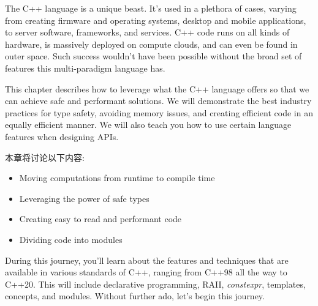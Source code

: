 
The C++ language is a unique beast. It's used in a plethora of cases, varying from creating firmware and operating systems, desktop and mobile applications, to server software, frameworks, and services. C++ code runs on all kinds of hardware, is massively deployed on compute clouds, and can even be found in outer space. Such success wouldn't have been possible without the broad set of features this multi-paradigm language has.

This chapter describes how to leverage what the C++ language offers so that we can achieve safe and performant solutions. We will demonstrate the best industry practices for type safety, avoiding memory issues, and creating efficient code in an equally efficient manner. We will also teach you how to use certain language features when designing APIs.


本章将讨论以下内容:

\begin{itemize}
\item Moving computations from runtime to compile time
\item Leveraging the power of safe types
\item Creating easy to read and performant code
\item Dividing code into modules
\end{itemize}

During this journey, you'll learn about the features and techniques that are available in various standards of C++, ranging from C++98 all the way to C++20. This will include declarative programming, RAII, \textit{constexpr}, templates, concepts, and modules. Without further ado, let's begin this journey.






